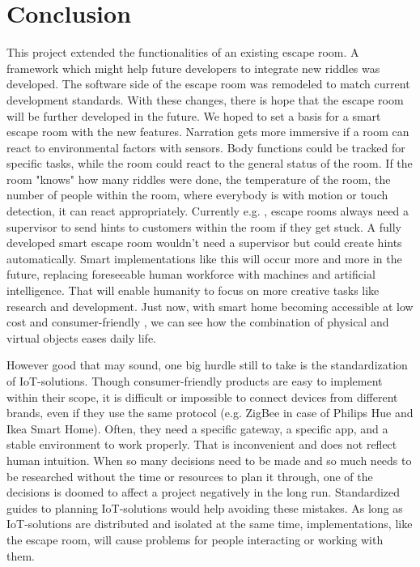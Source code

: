\section{Conclusion}
This project extended the functionalities of an existing escape room.
A framework which might help future developers to integrate new riddles was developed.
The software side of the escape room was remodeled to match current development standards.
With these changes, there is hope that the escape room will be further developed in the future.
We hoped to set a basis for a smart escape room with the new features.
Narration gets more immersive if a room can react to environmental factors with sensors. 
Body functions could be tracked for specific tasks, while the room could react to the general status of the room. 
If the room "knows" how many riddles were done, the temperature of the room, 
the number of people within the room, where everybody is with motion or touch detection, it can react appropriately.
Currently e.g. , escape rooms always need a supervisor to send hints to customers within the room if they get stuck. 
A fully developed smart escape room wouldn't need a supervisor but could create hints automatically.
Smart implementations like this will occur more and more in the future, 
replacing foreseeable human workforce with machines and artificial intelligence. 
That will enable humanity to focus on more creative tasks like research and development.
Just now, with smart home becoming accessible at low cost and consumer-friendly \parencite{Ikea} , we can see how the combination of physical and virtual objects 
eases daily life. 

However good that may sound, one big hurdle still to take is the standardization of IoT-solutions. 
Though consumer-friendly products are easy to implement within their scope, 
it is difficult or impossible to connect devices from different brands, even if they use the same protocol
(e.g. ZigBee in case of Philips Hue and Ikea Smart Home). 
Often, they need a specific gateway, a specific app, and a stable environment to work properly. 
That is inconvenient and does not reflect human intuition. 
When so many decisions need to be made and so much needs to be researched without the time or resources to plan it through, 
one of the decisions is doomed to affect a project negatively in the long run. 
Standardized guides to planning IoT-solutions would help avoiding these mistakes.
As long as IoT-solutions are distributed and isolated at the same time, 
implementations, like the escape room, will cause problems for people interacting or working with them.

